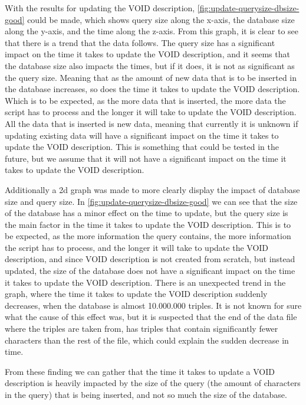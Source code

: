 With the results for updating the VOID description, \autoref{fig:update-querysize-dbsize-good} could be made, which shows query size along the x-axis, the database size along the y-axis, and the time along the z-axis. From this graph, it is clear to see that there is a trend that the data follows. The query size has a significant impact on the time it takes to update the VOID description, and it seems that the database size also impacts the times, but if it does, it is not as significant as the query size. Meaning that as the amount of new data that is to be inserted in the database increases, so does the time it takes to update the VOID description. Which is to be expected, as the more data that is inserted, the more data the script has to process and the longer it will take to update the VOID description. All the data that is inserted is new data, meaning that currently it is unknown if updating existing data will have a significant impact on the time it takes to update the VOID description. This is something that could be tested in the future, but we assume that it will not have a significant impact on the time it takes to update the VOID description.

Additionally a 2d graph was made to more clearly display the impact of database size and query size. In \autoref{fig:update-querysize-dbsize-good} we can see that the size of the database has a minor effect on the time to update, but the query size is the main factor in the time it takes to update the VOID description. This is to be expected, as the more information the query contains, the more information the script has to process, and the longer it will take to update the VOID description, and since VOID description is not created from scratch, but instead updated, the size of the database does not have a significant impact on the time it takes to update the VOID description. There is an unexpected trend in the graph, where the time it takes to update the VOID description suddenly decreases, when the database is almost 10.000.000 triples. It is not known for sure what the cause of this effect was, but it is suspected that the end of the data file where the triples are taken from, has triples that contain significantly fewer characters than the rest of the file, which could explain the sudden decrease in time.

From these finding we can gather that the time it takes to update a VOID description is heavily impacted by the size of the query (the amount of characters in the query) that is being inserted, and not so much the size of the database.


